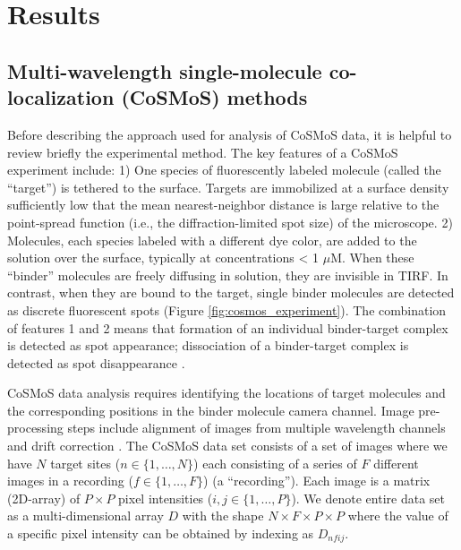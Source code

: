 \section{Results}

\subsection{Multi-wavelength single-molecule co-localization (CoSMoS) methods}

Before describing the approach used for analysis of CoSMoS data, it is helpful to  review briefly the experimental method. The key features of a CoSMoS experiment include: 1) One species of fluorescently labeled molecule (called the “target”) is tethered to the surface. Targets are immobilized at a surface density sufficiently low that the mean nearest-neighbor distance is large relative to the point-spread function (i.e., the diffraction-limited spot size) of the microscope.
2) Molecules, each species labeled with a different dye color, are added to the solution over the surface, typically at concentrations < 1 $\mu$M. When these “binder” molecules are freely diffusing in solution, they are invisible in TIRF. In contrast, when they are bound to the target, single binder molecules are detected as discrete fluorescent spots (Figure \ref{fig:cosmos_experiment}). The combination of features 1 and 2 means that formation of an individual binder-target complex is detected as spot appearance; dissociation of a binder-target complex is detected as spot disappearance \citep{Friedman2006-kb, Friedman2015-nx}.

CoSMoS data analysis requires identifying the locations of target molecules and the corresponding positions in the binder molecule camera channel. Image pre-processing steps include alignment of images from multiple wavelength channels and drift correction \citep{Friedman2015-nx, Smith2019-yb}. The CoSMoS data set consists of a set of images where we have $N$ target sites ($n \in \{1,\dots,N\}$) each consisting of a series of $F$ different images in a recording ($f \in \{1,\dots,F\}$) (a “recording”). Each image is a matrix (2D-array) of $P \times P$ pixel intensities ($i,j \in \{1,\dots,P\}$). We denote entire data set as a multi-dimensional array $D$ with the shape $N \times F \times P \times P$ where the value of a specific pixel intensity can be obtained by indexing as $D_{nfij}$. 

